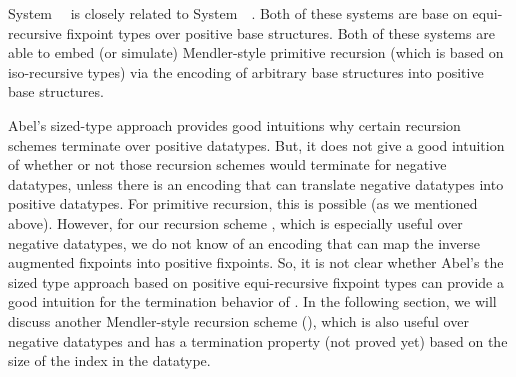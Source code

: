 System~\Fwhat\ \cite{abel06phd} is closely related to
System~\Fixw\ \cite{AbeMat04}. Both of these systems are base on
equi-recursive fixpoint types over positive base structures.
Both of these systems are able to embed (or simulate) Mendler-style
primitive recursion (which is based on iso-recursive types) via
the encoding \cite{Geu92} of arbitrary base structures into
positive base structures.

Abel's sized-type approach provides good intuitions why 
certain recursion schemes terminate over positive datatypes.
But, it does not give a good intuition of whether or not
those recursion schemes would terminate for negative datatypes,
unless there is an encoding that can translate negative datatypes into
positive datatypes. For primitive recursion, this is possible (as we
mentioned above). However, for our recursion scheme \MsfIt, which is
especially useful over negative datatypes, we do not know of an encoding
that can map the inverse augmented fixpoints into positive fixpoints.
So, it is not clear whether Abel's the sized type approach based on
positive equi-recursive fixpoint types can provide a good intuition
for the termination behavior of \MsfIt. In the following section,
we will discuss another Mendler-style recursion scheme (\mprsi{}), which
is also useful over negative datatypes and has a termination property
(not proved yet) based on the size of the index in the datatype.



